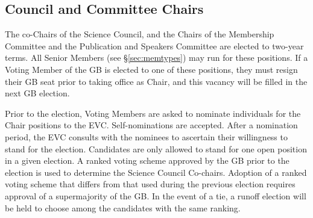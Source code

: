\documentclass[12pt]{article}
\begin{document}


\subsection{Council and Committee Chairs}
The co-Chairs of the Science Council, and the Chairs of the Membership Committee and the Publication and Speakers Committee are elected to two-year terms. All Senior Members (see \S\ref{sec:memtypes}) may  run for these positions.  If a Voting Member of the GB is elected to one of these positions, they must resign their GB seat prior to taking office as Chair, and this vacancy will be filled in the next GB election. 

Prior to the election, Voting Members are asked to nominate individuals for the Chair positions to the EVC.   Self-nominations are accepted.
After a nomination period, the EVC consults with the nominees to ascertain their willingness to stand for the election. Candidates are only allowed to stand for one open position in a given election.  
A ranked voting scheme approved by the GB prior to the election %
is used to determine the Science Council Co-chairs. Adoption of a ranked voting scheme that differs from that used during the previous election requires approval of a supermajority of the GB.
In the event of a tie, a runoff election will be held  to choose among the candidates with the same ranking.
\end{document}
